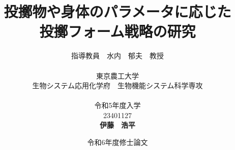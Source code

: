 


\usepackage{ikuo}%

\usepackage[dvipdfmx]{hyperref}  %
\usepackage{pxjahyper} %
\hypersetup{colorlinks=true}
\hypersetup{linkcolor=black}
\hypersetup{urlcolor=black}
\hypersetup{citecolor=black}

\usepackage{url} %

\newcommand{\FIGDIR}{./fig}        %


\date{令和6年度修士論文}
\title{投擲物や身体のパラメータに応じた\\投擲フォーム戦略の研究}
\author{指導教員　水内　郁夫　教授 \\
\ \\
東京農工大学　\\
生物システム応用化学府　生物機能システム科学専攻　\\
\ \\
令和5年度入学\\
23401127\\
{\bf 伊藤　浩平}}


\setlength{\baselineskip}{20pt}
\maketitle
\tableofcontents










